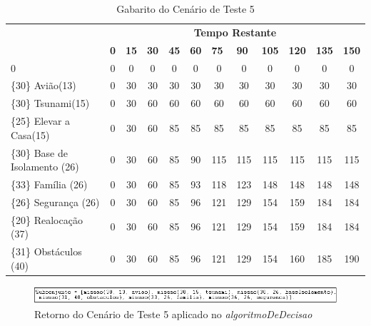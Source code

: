\begin{table}[!h]
\centering
\caption{Gabarito do Cenário de Teste 5}
\label{gabarito5}
\begin{tabular}{lccccccccccc}
\multicolumn{1}{c}{\cellcolor[HTML]{00D2CB}} & \multicolumn{11}{c}{\cellcolor[HTML]{00D2CB}\textbf{Tempo Restante}} \\ 
\multicolumn{1}{c}{\cellcolor[HTML]{00D2CB}{\color[HTML]{333333} \textbf{\{Valor\} Missão(Tempo)}}} & 
\multicolumn{1}{l}{\cellcolor[HTML]{C0F2F0}\textbf{0}} & 
\multicolumn{1}{l}{\cellcolor[HTML]{C0F2F0}\textbf{15}} & 
\multicolumn{1}{l}{\cellcolor[HTML]{C0F2F0}\textbf{30}} & 
\multicolumn{1}{l}{\cellcolor[HTML]{C0F2F0}\textbf{45}} & 
\multicolumn{1}{l}{\cellcolor[HTML]{C0F2F0}\textbf{60}} & 
\multicolumn{1}{l}{\cellcolor[HTML]{C0F2F0}\textbf{75}} & 
\multicolumn{1}{l}{\cellcolor[HTML]{C0F2F0}\textbf{90}} & 
\multicolumn{1}{l}{\cellcolor[HTML]{C0F2F0}\textbf{105}} & 
\multicolumn{1}{l}{\cellcolor[HTML]{C0F2F0}\textbf{120}} & 
\multicolumn{1}{l}{\cellcolor[HTML]{C0F2F0}\textbf{135}} & 
\multicolumn{1}{l}{\cellcolor[HTML]{C0F2F0}\textbf{150}} \\ 
0 & 0 & 0 & 0 & 0 & 0 & 0 & 0 & 0 & 0 & 0 & 0  \\ 
\{30\}  Avião(13) & 0 & 30 & 30 & 30 & 30 & 30 & 30 & 30 & 30 & 30 & 30 \\ 
\{30\}  Tsunami(15) & 0 & 30 & 60 & 60 & 60 & 60 & 60 & 60 & 60 & 60 & 60 \\ 
{\color[HTML]{FE0000} \{25\}  Elevar a Casa(15)}& 0 & 30 & 60 & 85 & 85  & 85  & 85  & 85 & 85 & 85 & 85 \\ 
\{30\}  Base de Isolamento (26) & 0 & 30 & 60 & 85 & 90  & 115  & 115  & 115 & 115 & 115 & 115 \\ 
\{33\}  Família (26) & 0 & 30 & 60 & 85 & 93  & 118 & 123  & 148 & 148 & 148 & 148 \\ 
\{26\}  Segurança (26) & 0 & 30 & 60 & 85 & 96 & 121  & 129  & 154 & 159 & 184 & 184 \\ 
{\color[HTML]{FE0000} \{20\}  Realocação (37)} & 0 & 30 & 60 & 85 & 96 & 121  & 129  & 154 & 159 & 184 & 184 \\ 
\{31\}  Obstáculos (40) & 0 & 30 & 60 & 85 & 96 & 121  & 129  & 154 & 160 & 185 & 190 \\ 
\end{tabular}
\end{table}


\FloatBarrier
\begin{figure}[!h]
\centering
\includegraphics[keepaspectratio=true,scale=0.7]{figuras/resultado5.png}
\caption{Retorno do Cenário de Teste 5 aplicado no \textit{algoritmoDeDecisao}}
\label{resultado5}
\end{figure}


